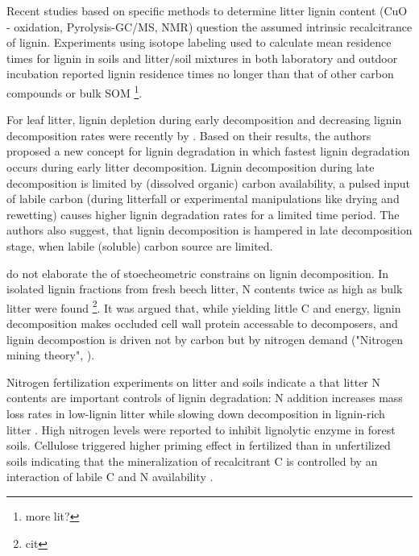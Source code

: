 \documentclass[authoryear,preprint,review,12pt]{elsarticle}
\begin{document}
Recent studies based on specific methods to determine litter lignin content (CuO - oxidation, Pyrolysis-GC/MS, NMR) question the assumed intrinsic recalcitrance of lignin. Experiments using isotope labeling used to calculate mean residence times for lignin in soils and litter/soil mixtures in both laboratory and outdoor incubation reported lignin residence times no longer than that of other carbon compounds or bulk SOM \citep{Thevenot2010a, Bol2009}\footnote{more lit?}.

For leaf litter, lignin depletion during early decomposition and decreasing lignin decomposition rates were recently by \cite{Klotzbucher2011}. Based on their results, the authors proposed a new concept for lignin degradation in which fastest lignin degradation occurs during early litter decomposition. Lignin decomposition during late decomposition is limited by (dissolved organic) carbon availability, a pulsed input of labile carbon (during litterfall or experimental manipulations like drying and rewetting) causes higher lignin degradation rates for a limited time period. The authors also suggest, that lignin decomposition is hampered in late decomposition stage, when labile (soluble) carbon source are limited. %

\cite{Klotzbucher2011} do not elaborate the of stoecheometric constrains on lignin decomposition. In isolated lignin fractions from fresh beech litter, N contents twice as high as bulk litter were found \footnote{cit}. It was argued that, while yielding little C and energy, lignin decomposition makes occluded cell wall protein accessable to decomposers, and lignin decompostion is driven not by carbon but by nitrogen demand ("Nitrogen mining theory", \cite{Craine2007}). 

Nitrogen fertilization experiments on litter and soils indicate a that litter N contents are important controls of lignin degradation: N addition increases mass loss rates in low-lignin litter while slowing down decomposition in lignin-rich litter \citep{Knorr2005}. High nitrogen levels were reported to inhibit lignolytic enzyme in forest soils\citep{Sinsabaugh2010}. Cellulose triggered higher priming effect in fertilized than in unfertilized soils indicating that the mineralization of recalcitrant C is controlled by an interaction of labile C and N availability \citep{Fontaine2011}.
\end{document}
